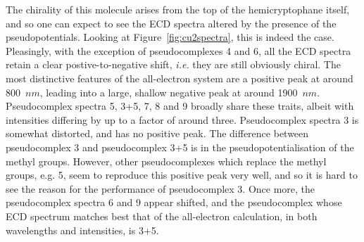 \documentclass[aip,reprint,nofootinbib]{revtex4-1}
\begin{document}
The chirality of this molecule arises from the top of the hemicryptophane itself, and so one can expect to see the ECD spectra altered by the presence of the pseudopotentials. Looking at Figure~\ref{fig:cu2spectra}, this is indeed the case. Pleasingly, with the exception of pseudocomplexes 4 and 6, all the ECD spectra retain a clear postive-to-negative shift, \emph{i.e.} they are still obviously chiral. The most distinctive features of the all-electron system are a positive peak at around 800~$nm$, leading into a large, shallow negative peak at around 1900~$nm$. Pseudocomplex spectra 5, 3+5, 7, 8 and 9 broadly share these traits, albeit with intensities differing by up to a factor of around three. Pseudocomplex spectra 3 is somewhat distorted, and has no positive peak. The difference between pseudocomplex 3 and pseudocomplex 3+5 is in the pseudopotentialisation of the methyl groups. However, other pseudocomplexes which replace the methyl groups, e.g. 5, seem to reproduce this positive peak very well, and so it is hard to see the reason for the performance of pseudocomplex 3. Once more, the pseudocomplex spectra 6 and 9 appear shifted, and the pseudocomplex whose ECD spectrum matches best that of the all-electron calculation, in both wavelengths and intensities, is 3+5.
\end{document}
